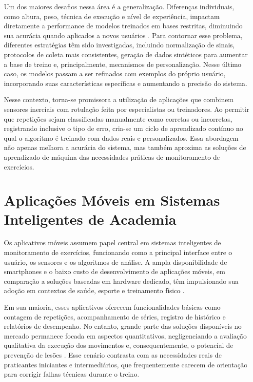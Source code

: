 Um dos maiores desafios nessa área é a generalização. Diferenças individuais, como altura, peso, técnica de execução e nível de experiência, impactam diretamente a performance de modelos treinados em bases restritas, diminuindo sua acurácia quando aplicados a novos usuários \cite{balkhi-multipurpose-nodate}. Para contornar esse problema, diferentes estratégias têm sido investigadas, incluindo normalização de sinais, protocolos de coleta mais consistentes, geração de dados sintéticos para aumentar a base de treino e, principalmente, mecanismos de personalização. Nesse último caso, os modelos passam a ser refinados com exemplos do próprio usuário, incorporando suas características específicas e aumentando a precisão do sistema.  

Nesse contexto, torna-se promissora a utilização de aplicações que combinem sensores inerciais com rotulação feita por especialistas ou treinadores. Ao permitir que repetições sejam classificadas manualmente como corretas ou incorretas, registrando inclusive o tipo de erro, cria-se um ciclo de aprendizado contínuo no qual o algoritmo é treinado com dados reais e personalizados. Essa abordagem não apenas melhora a acurácia do sistema, mas também aproxima as soluções de aprendizado de máquina das necessidades práticas de monitoramento de exercícios.

\section{Aplicações Móveis em Sistemas Inteligentes de Academia}

Os aplicativos móveis assumem papel central em sistemas inteligentes de monitoramento de exercícios, funcionando como a principal interface entre o usuário, os sensores e os algoritmos de análise. A ampla disponibilidade de smartphones e o baixo custo de desenvolvimento de aplicações móveis, em comparação a soluções baseadas em hardware dedicado, têm impulsionado sua adoção em contextos de saúde, esporte e treinamento físico \cite{balkhi-multipurpose-nodate,gupta-yogahelp-2021}.  

Em sua maioria, esses aplicativos oferecem funcionalidades básicas como contagem de repetições, acompanhamento de séries, registro de histórico e relatórios de desempenho. No entanto, grande parte das soluções disponíveis no mercado permanece focada em aspectos quantitativos, negligenciando a avaliação qualitativa da execução dos movimentos e, consequentemente, o potencial de prevenção de lesões \cite{dzaja-quantitative-nodate}. Esse cenário contrasta com as necessidades reais de praticantes iniciantes e intermediários, que frequentemente carecem de orientação para corrigir falhas técnicas durante o treino.  

